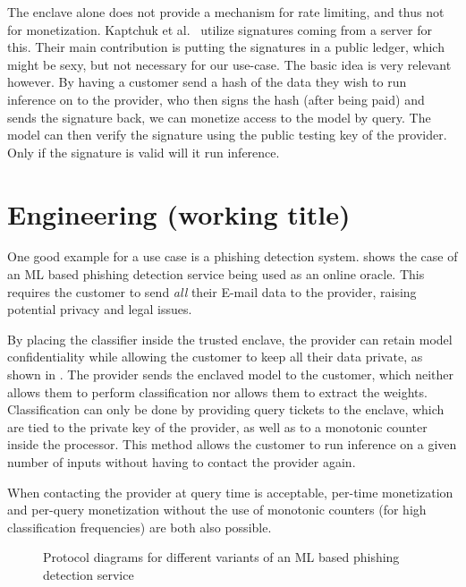 \documentclass[11pt,twocolumn]{article}
\newcommand{\mail}{E-mail}
\begin{document}
The enclave alone does not provide a mechanism for rate limiting, and thus not for monetization.
Kaptchuk et al.~\cite{kaptchuk_giving_nodate} utilize signatures coming from a server for this.
Their main contribution is putting the signatures in a public ledger, which might be sexy, but not necessary for our use-case.
The basic idea is very relevant however.
By having a customer send a hash of the data they wish to run inference on to the provider, who then signs the hash (after being paid) and sends the signature back, we can monetize access to the model by query.
The model can then verify the signature using the public testing key of the provider.
Only if the signature is valid will it run inference.

\section{Engineering (working title)}
\label{sec:engineering}

One good example for a use case is a phishing detection system.
 shows the case of an ML based phishing detection service being used as an online oracle.
This requires the customer to send \emph{all} their \mail{} data to the provider, raising potential privacy and legal issues.

By placing the classifier inside the trusted enclave, the provider can retain model confidentiality while allowing the customer to keep all their data private, as shown in .
The provider sends the enclaved model to the customer, which neither allows them to perform classification nor allows them to extract the weights.
Classification can only be done by providing query tickets to the enclave, which are tied to the private key of the provider, as well as to a monotonic counter inside the processor.
This method allows the customer to run inference on a given number of inputs without having to contact the provider again.

When contacting the provider at query time is acceptable, per-time monetization and per-query monetization without the use of monotonic counters (for high classification frequencies) are both also possible.

\begin{figure}[h]
    \begin{subfigure}[b]{0.5\textwidth}
        
		\label{fig:online-phishing}
    \end{subfigure}

    \begin{subfigure}[b]{0.5\textwidth}
        
        \label{fig:offline-phishing}
    \end{subfigure}
	\caption{Protocol diagrams for different variants of an ML based phishing detection service}
\end{figure}
\end{document}
